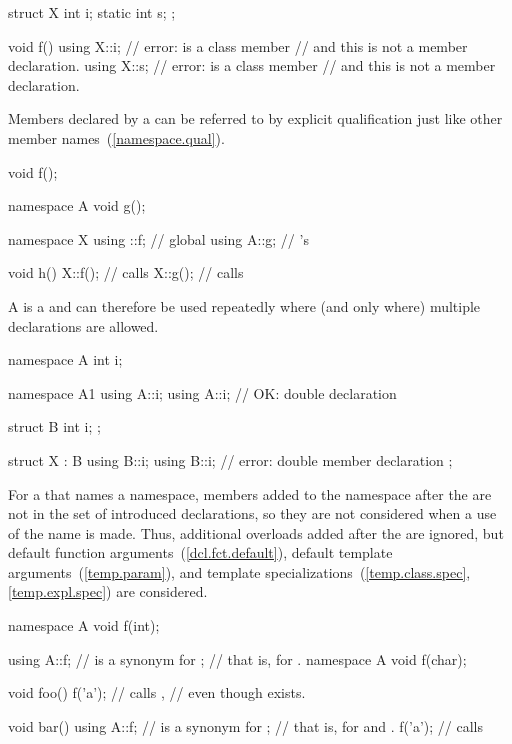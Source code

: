 \begin{codeblock}
struct X {
  int i;
  static int s;
};

void f() {
  using X::i;       // error:  is a class member
                    // and this is not a member declaration.
  using X::s;       // error:  is a class member
                    // and this is not a member declaration.
}
\end{codeblock}
\exitexample

\pnum
Members declared by a  can be referred to by
explicit qualification just like other member
names~(\ref{namespace.qual}).
\enterexample

\begin{codeblock}
void f();

namespace A {
  void g();
}

namespace X {
  using ::f;        // global 
  using A::g;       // 's 
}

void h()
{
  X::f();           // calls 
  X::g();           // calls 
}
\end{codeblock}
\exitexample

\pnum
A  is a  and can
therefore be used repeatedly where (and only where) multiple
declarations are allowed.
\enterexample

\begin{codeblock}
namespace A {
  int i;
}

namespace A1 {
  using A::i;
  using A::i;       // OK: double declaration
}

struct B {
  int i;
};

struct X : B {
  using B::i;
  using B::i;       // error: double member declaration
};
\end{codeblock}
\exitexample

\pnum
\enternote
For a  that names a namespace,
members added to the namespace after the 
are not in the set of introduced declarations, so they are not
considered when a use of the name is made. Thus, additional
overloads added after the  are ignored, but
default function arguments~(\ref{dcl.fct.default}), default template
arguments~(\ref{temp.param}), and template specializations~(\ref{temp.class.spec},
\ref{temp.expl.spec}) are considered. \exitnote
\enterexample

\begin{codeblock}
namespace A {
  void f(int);
}

using A::f;         //  is a synonym for ;
                    // that is, for .
namespace A {
  void f(char);
}

void foo() {
  f('a');           // calls ,
}                   // even though  exists.

void bar() {
  using A::f;       //  is a synonym for ;
                    // that is, for  and .
  f('a');           // calls 
}
\end{codeblock}
\exitexample

